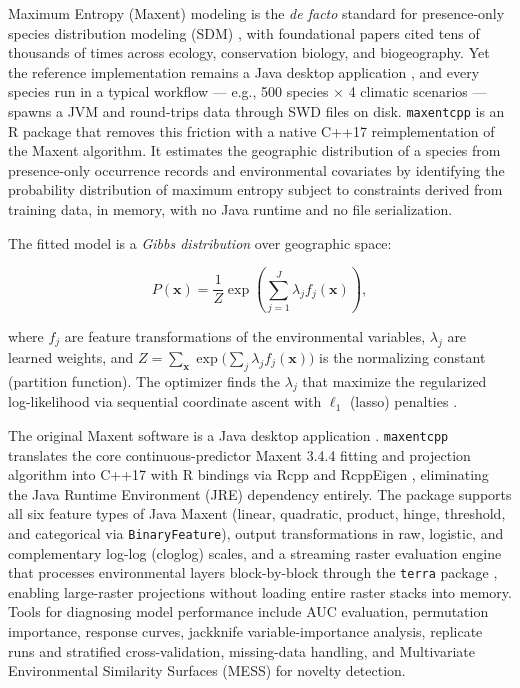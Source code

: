 \documentclass[10pt,letterpaper]{article}
\begin{document}
Maximum Entropy (Maxent) modeling is the \emph{de facto} standard for
presence-only species distribution modeling (SDM)
\cite{Phillips2006,Phillips2004,Elith2011}, with foundational papers
cited tens of thousands of times across ecology, conservation biology,
and biogeography. Yet the reference implementation remains a Java
desktop application \cite{Phillips2017}, and every species run in a
typical workflow --- e.g., 500 species \(\times\) 4 climatic scenarios
--- spawns a JVM and round-trips data through SWD files on disk.
\texttt{maxentcpp} is an R package that removes this friction with a
native C++17 reimplementation of the Maxent algorithm. It estimates the
geographic distribution of a species from presence-only occurrence
records and environmental covariates by identifying the probability
distribution of maximum entropy \cite{Jaynes1957} subject to
constraints derived from training data, in memory, with no Java runtime
and no file serialization.

The fitted model is a \emph{Gibbs distribution} over geographic space:

\[
P(\mathbf{x}) = \frac{1}{Z}\exp\!\left(\sum_{j=1}^{J} \lambda_j f_j(\mathbf{x})\right),
\]

where \(f_j\) are feature transformations of the environmental
variables, \(\lambda_j\) are learned weights, and
\(Z = \sum_{\mathbf{x}}\exp\!\bigl(\sum_j \lambda_j f_j(\mathbf{x})\bigr)\)
is the normalizing constant (partition function). The optimizer finds
the \(\lambda_j\) that maximize the regularized log-likelihood via
sequential coordinate ascent with \(\ell_1\) (lasso) penalties
\cite{Phillips2006,Elith2011}.

The original Maxent software is a Java desktop application
\cite{Phillips2017}. \texttt{maxentcpp} translates the core
continuous-predictor Maxent 3.4.4 fitting and projection algorithm into
C++17 with R bindings via Rcpp \cite{Eddelbuettel2011} and RcppEigen
\cite{Bates2013}, eliminating the Java Runtime Environment (JRE)
dependency entirely. The package supports all six feature types of Java
Maxent (linear, quadratic, product, hinge, threshold, and categorical
via \texttt{BinaryFeature}), output transformations in raw, logistic,
and complementary log-log (cloglog) scales, and a streaming raster
evaluation engine that processes environmental layers block-by-block
through the \texttt{terra} package \cite{Hijmans2024}, enabling
large-raster projections without loading entire raster stacks into
memory. Tools for diagnosing model performance include AUC evaluation,
permutation importance, response curves, jackknife variable-importance
analysis, replicate runs and stratified cross-validation, missing-data
handling, and Multivariate Environmental Similarity Surfaces (MESS)
\cite{Elith2010} for novelty detection.
\end{document}
